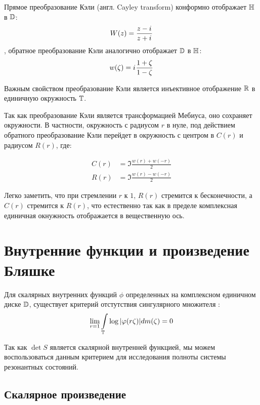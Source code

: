Прямое преобразование Кэли (англ. Cayley transform) конформно отображает $\mathbb{H}$ в $\mathbb{D}$:
\begin{equation}\label{eq:cayley}
W(z) = \frac{z - {i\mkern1mu}}{z + {i\mkern1mu}}
\end{equation}
, обратное преобразование Кэли аналогично отображает $\mathbb{D}$ в $\mathbb{H}$:
\begin{equation}\label{eq:cayley_inverse}
w(\zeta) = {i\mkern1mu} \frac{1 + \zeta}{1 - \zeta}
\end{equation}

Важным свойством преобразование Кэли является инъективное отображение $\mathbb{R}$ в единичную окружность $\mathbb{T}$.

Так как преобразование Кэли является трансформацией Мебиуса, оно сохраняет окружности. В частности, окружность с радиусом $r$ в нуле, под действием обратного преобразование Кэли перейдет в окружность с центром в $C(r)$ и радиусом $R(r)$, где:

\begin{equation}\label{eq:c_and_r}
\begin{aligned}
   C(r) &= \Im \frac{w(r) + w(-r)}{2}
\\ R(r) &= \Im \frac{w(r) - w(-r)}{2}
\end{aligned}
\end{equation}

Легко заметить, что при стремлении $r$ к $1$, $R(r)$ стремится к бесконечности, а $C(r)$ стремится к $R(r)$, что естественно так как в пределе комплексная единичная окнужность отображается в вещественную ось.


\section{Внутренние функции и произведение Бляшке}
Для скалярных внутренних функций $\phi$ определенных на комплексном единичном диске $\mathbb{D}$, существует критерий отстутствия сингулярного множителя \cite[стр. 99]{nikol2012treatise}:
\[
\lim\limits_{r = 1} \int\limits_{\mathbb{T}} \log \abs{\varphi(r \zeta)} d m(\zeta) = 0
\]

Так как $\det S$ является скалярной внутренней функцией, мы можем воспользоваться данным критерием для исследования полноты системы резонантных состояний.



\subsection{Скалярное произведение}

